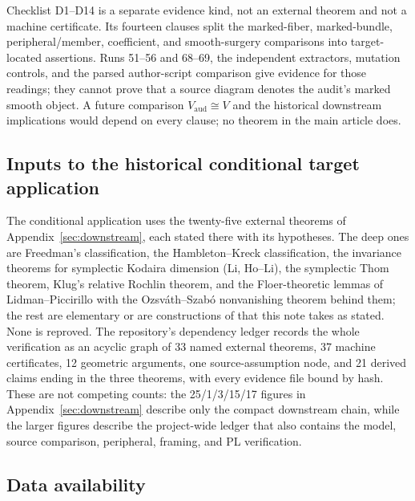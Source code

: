 \documentclass[11pt]{article}
\theoremstyle{definition}
\begin{document}
Checklist D1--D14 is a separate evidence kind, not an external theorem and
not a machine certificate.  Its fourteen clauses split
the marked-fiber, marked-bundle, peripheral/member, coefficient, and
smooth-surgery comparisons into target-located assertions.  Runs 51--56 and
68--69, the independent extractors, mutation controls, and the parsed
author-script comparison give evidence for those readings; they cannot prove
that a source diagram denotes the audit's marked smooth object.  A future
comparison $V_{\mathrm{aud}}\cong V$ and the historical downstream
implications would depend on every clause; no theorem in the main article
does.

\subsection*{Inputs to the historical conditional target application}

The conditional application uses the twenty-five external theorems of
Appendix~\ref{sec:downstream}, each stated there with its hypotheses. The deep ones are Freedman's
classification, the Hambleton--Kreck classification, the invariance
theorems for symplectic Kodaira dimension (Li, Ho--Li), the symplectic
Thom theorem, Klug's relative Rochlin theorem, and the Floer-theoretic
lemmas of Lidman--Piccirillo with the Ozsv\'ath--Szab\'o nonvanishing
theorem behind them; the rest are elementary or are constructions of
\cite{LidmanPiccirillo} that this note takes as stated. None is reproved.
The repository's dependency ledger records the whole verification as an
acyclic graph of 33 named external theorems, 37 machine certificates, 12
geometric arguments, one source-assumption node, and 21 derived claims ending
in the three theorems,
with every evidence file bound by hash. These are not competing counts: the
25/1/3/15/17 figures in Appendix~\ref{sec:downstream} describe only the compact
downstream chain, while the larger figures describe the project-wide ledger
that also contains the model, source comparison, peripheral, framing, and PL
verification.

\subsection*{Data availability}
\end{document}
